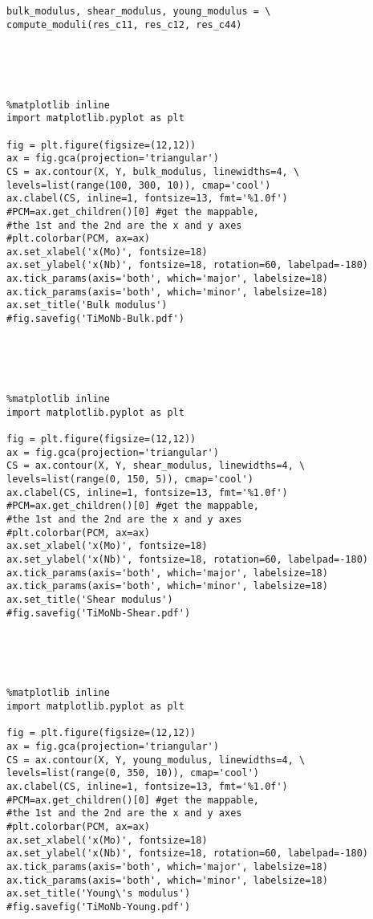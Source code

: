 {\begin{lstlisting}
bulk_modulus, shear_modulus, young_modulus = \
compute_moduli(res_c11, res_c12, res_c44)





%matplotlib inline
import matplotlib.pyplot as plt

fig = plt.figure(figsize=(12,12))
ax = fig.gca(projection='triangular')
CS = ax.contour(X, Y, bulk_modulus, linewidths=4, \
levels=list(range(100, 300, 10)), cmap='cool')
ax.clabel(CS, inline=1, fontsize=13, fmt='%1.0f')
#PCM=ax.get_children()[0] #get the mappable, 
#the 1st and the 2nd are the x and y axes
#plt.colorbar(PCM, ax=ax)
ax.set_xlabel('x(Mo)', fontsize=18)
ax.set_ylabel('x(Nb)', fontsize=18, rotation=60, labelpad=-180)
ax.tick_params(axis='both', which='major', labelsize=18)
ax.tick_params(axis='both', which='minor', labelsize=18)
ax.set_title('Bulk modulus')
#fig.savefig('TiMoNb-Bulk.pdf')





%matplotlib inline
import matplotlib.pyplot as plt

fig = plt.figure(figsize=(12,12))
ax = fig.gca(projection='triangular')
CS = ax.contour(X, Y, shear_modulus, linewidths=4, \
levels=list(range(0, 150, 5)), cmap='cool')
ax.clabel(CS, inline=1, fontsize=13, fmt='%1.0f')
#PCM=ax.get_children()[0] #get the mappable, 
#the 1st and the 2nd are the x and y axes
#plt.colorbar(PCM, ax=ax)
ax.set_xlabel('x(Mo)', fontsize=18)
ax.set_ylabel('x(Nb)', fontsize=18, rotation=60, labelpad=-180)
ax.tick_params(axis='both', which='major', labelsize=18)
ax.tick_params(axis='both', which='minor', labelsize=18)
ax.set_title('Shear modulus')
#fig.savefig('TiMoNb-Shear.pdf')





%matplotlib inline
import matplotlib.pyplot as plt

fig = plt.figure(figsize=(12,12))
ax = fig.gca(projection='triangular')
CS = ax.contour(X, Y, young_modulus, linewidths=4, \
levels=list(range(0, 350, 10)), cmap='cool')
ax.clabel(CS, inline=1, fontsize=13, fmt='%1.0f')
#PCM=ax.get_children()[0] #get the mappable, 
#the 1st and the 2nd are the x and y axes
#plt.colorbar(PCM, ax=ax)
ax.set_xlabel('x(Mo)', fontsize=18)
ax.set_ylabel('x(Nb)', fontsize=18, rotation=60, labelpad=-180)
ax.tick_params(axis='both', which='major', labelsize=18)
ax.tick_params(axis='both', which='minor', labelsize=18)
ax.set_title('Young\'s modulus')
#fig.savefig('TiMoNb-Young.pdf')

\end{lstlisting}
}
